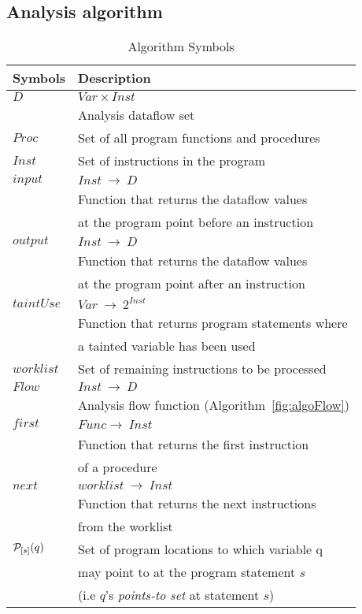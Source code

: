 \subsection{Analysis algorithm} 
\begin{table}
\begin{tabular}{|l|l|}
\hline
\textbf{Symbols}	&	\textbf{Description}							\\ \hline
$\mathit{D}$		&	$\mathit{Var} \times \mathit{Inst}$		\\
					&	Analysis dataflow set 							\\ \hline
$\mathit{Proc}$		&	Set of all program functions and procedures 	\\ \hline
$\mathit{Inst}$		&	Set of instructions in the program 				\\ \hline
$\mathit{input}$	&	$\mathit{Inst}\ \rightarrow\ \mathit{D}$ 		\\
					&	Function that returns the dataflow values		\\
		    		&	at the program point before an instruction 		\\ 	\hline
$\mathit{output}$	&	$\mathit{Inst}\ \rightarrow\ \mathit{D}$ 		\\
					&	Function that returns the dataflow values		\\
		    		&	at the program point after an instruction 		\\ 	\hline
$\mathit{taintUse}$	&	$\mathit{Var}\ \rightarrow\ 2^{Inst}$ 				\\
					&	Function that returns program statements where	\\
		    		&	a tainted variable has been used	 			\\ 	\hline		    		
$\mathit{worklist}$	&	Set of remaining instructions to be processed 	\\ \hline
$\mathit{Flow}$		&	$\mathit{Inst}\ \rightarrow\ \mathit{D}$ 		\\
					&   Analysis flow function (Algorithm~\ref{fig:algoFlow}) 			\\ \hline
$\mathit{first}$	&	$\mathit{Func} \rightarrow\ \mathit{Inst}$ 		\\
					& 	Function that returns the first instruction		\\
					&	of a procedure									\\ \hline
$\mathit{next}$		&	$\mathit{worklist}\ \rightarrow\ \mathit{Inst}$ \\
					& 	Function that returns the next instructions		\\
					&	from the worklist								\\ \hline
$\mathcal{P}_{[s]}(q)$	&	Set of program locations to which variable q	\\
					&	may point to at the program statement $s$		\\
					& 	(i.e $q$'s \textit{points-to set} at statement $s$)	\\ \hline					
\end{tabular}
\caption{Algorithm Symbols}\label{symTable}
\end{table}


